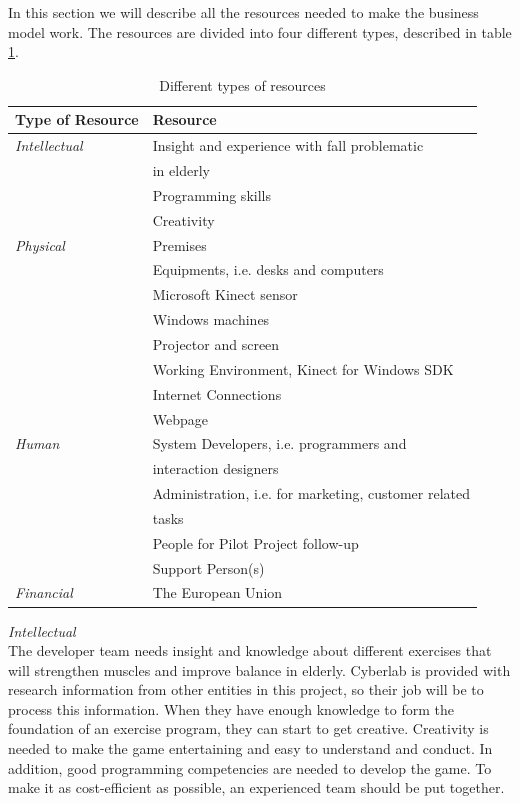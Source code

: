 In this section we will describe all the resources needed to make the business model work. The resources are divided into four different types, described in table \ref{tab:Resources}.
\newpage

\begin{table}
\centering
    \begin{tabular}{|l|l|}
        \hline
       \textbf{Type of Resource} & \textbf{Resource}  \\ \hline
       \emph{Intellectual} & Insight and experience with fall problematic \\ & in elderly \\ \cline{2-2}
        & Programming skills \\ \cline{2-2}
	 	& Creativity \\ \hline
	   \emph{Physical} & Premises \\ \cline{2-2}
	   	& Equipments, i.e. desks and computers  \\ \cline{2-2}
	   	& Microsoft Kinect sensor \\ \cline{2-2}
	   	& Windows machines \\ \cline{2-2}
	   	& Projector and screen \\ \cline{2-2}
	   	& Working Environment, Kinect for Windows SDK \\ \cline{2-2}
	   	& Internet Connections \\ \cline{2-2}
	   	& Webpage \\ \hline
	   \emph{Human} & System Developers, i.e. programmers and \\ & interaction designers \\ \cline{2-2}
	   	& Administration, i.e. for marketing, customer related \\ &tasks \\ \cline{2-2}
	   	&  People for Pilot Project follow-up \\ \cline{2-2}
	   	& Support Person(s) \\ \hline
	   \emph{Financial} & The European Union \\
        \hline
    \end{tabular}
    \caption[Resources]{Different types of resources}
    \label{tab:Resources}
\end{table} 
\emph{Intellectual} \\ The developer team needs insight and knowledge about different exercises that will strengthen muscles and improve balance in elderly. Cyberlab is provided with research information from other entities in this project, so their job will be to process this information. When they have enough knowledge to form the foundation of an exercise program, they can start to get creative. Creativity is needed to make the game entertaining and easy to understand and conduct. In addition, good programming competencies are needed to develop the game. To make it as cost-efficient as possible, an experienced team should be put together. \\ \\
